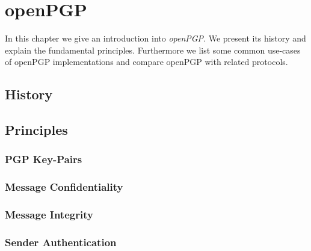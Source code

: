 \chapter{openPGP} \label{chapter:openpgp}

In this chapter we give an introduction into \textit{openPGP}. 
We present its history and explain the fundamental principles. 
Furthermore we list some common use-cases of openPGP implementations
and compare openPGP with related protocols.


\section{History}

\section{Principles} \label{section:openpgp:principles}


\subsection{PGP Key-Pairs} \label{section:openpgp:keys}

\subsection{Message Confidentiality} \label{section:openpgp:confidentiality}


\subsection{Message Integrity} \label{section:openpgp:integrity}


\subsection{Sender Authentication} \label{section:openpgp:authentication}




